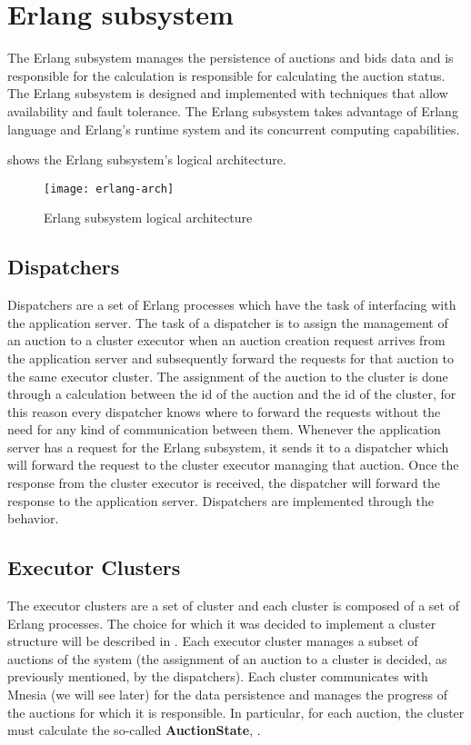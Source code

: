 \section{Erlang subsystem}\label{sec:archerlang}

The Erlang subsystem manages the persistence of auctions and bids data and is
responsible for the calculation is responsible for calculating the auction
status. The Erlang subsystem is designed and implemented with techniques that
allow availability and fault tolerance. The Erlang subsystem takes advantage of
Erlang language and Erlang's runtime system and its concurrent computing
capabilities.

 shows the Erlang subsystem's logical architecture.

\begin{figure}[htb]
	\centering
	\texttt{[image: erlang-arch]}
	\caption{Erlang subsystem logical architecture}\label{fig:erlang-arch}
\end{figure}

\subsection{Dispatchers}

Dispatchers are a set of Erlang processes which have the task of interfacing
with the application server. The task of a dispatcher is to assign the
management of an auction to a cluster executor when an auction creation request
arrives from the application server and subsequently forward the requests for
that auction to the same executor cluster. The assignment of the auction to the
cluster is done through a calculation between the id of the auction and the id
of the cluster, for this reason every dispatcher knows where to forward the
requests without the need for any kind of communication between them. Whenever
the application server has a request for the Erlang subsystem, it sends it to a
dispatcher which will forward the request to the cluster executor managing that
auction. Once the response from the cluster executor is received, the dispatcher
will forward the response to the application server. Dispatchers are implemented
through the  behavior.

\subsection{Executor Clusters}

The executor clusters are a set of cluster and each cluster is composed of a set
of Erlang processes. The choice for which it was decided to implement a cluster
structure will be described in . Each executor
cluster manages a subset of auctions of the system (the assignment of an auction
to a cluster is decided, as previously mentioned, by the dispatchers). Each
cluster communicates with Mnesia (we will see later) for the data persistence
and manages the progress of the auctions for which it is responsible. In
particular, for each auction, the cluster must calculate the so-called
\textbf{AuctionState}, .


